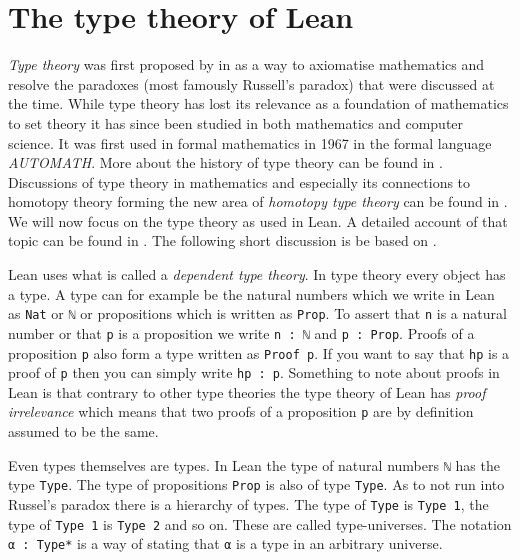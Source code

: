 \section{The type theory of Lean}
\label{sec:typetheory}

\emph{Type theory} was first proposed by  in \citeyear{Russell1908} \cite{Russell1908} as a way to axiomatise mathematics and resolve the paradoxes (most famously Russell's paradox) that were discussed at the time. 
While type theory has lost its relevance as a foundation of mathematics to set theory it has since been studied in both mathematics and computer science. 
It was first used in formal mathematics in 1967 in the formal language \emph{AUTOMATH}. 
More about the history of type theory can be found in \cite{Kamareddine2004}. 
Discussions of type theory in mathematics and especially its connections to homotopy theory forming the new area of \emph{homotopy type theory} can be found in \cite{hottbook}.
We will now focus on the type theory as used in Lean.
A detailed account of that topic can be found in \cite{Carneiro2019}. 
The following short discussion is be based on \cite{Avigad2024}. 

Lean uses what is called a \emph{dependent type theory}.
In type theory every object has a type. 
A type can for example be the natural numbers which we write in Lean as \lstinline{Nat} or \lstinline{ℕ} or propositions which is written as \lstinline{Prop}.
To assert that \lstinline{n} is a natural number or that \lstinline{p} is a proposition we write \lstinline{n : ℕ} and \lstinline{p : Prop}. 
Proofs of a proposition \lstinline{p} also form a type written as \lstinline{Proof p}.
If you want to say that \lstinline{hp} is a proof of \lstinline{p} then you can simply write \lstinline{hp : p}.
Something to note about proofs in Lean is that contrary to other type theories the type theory of Lean has \emph{proof irrelevance} which means that two proofs of a proposition \lstinline{p} are by definition assumed to be the same.

Even types themselves are types. 
In Lean the type of natural numbers \lstinline{ℕ} has the type \lstinline{Type}. 
The type of propositions \lstinline{Prop} is also of type \lstinline{Type}.
As to not run into Russel's paradox there is a hierarchy of types. 
The type of \lstinline{Type} is \lstinline{Type 1}, the type of \lstinline{Type 1} is \lstinline{Type 2} and so on.
These are called type-universes. 
The notation \lstinline{α : Type*} is a way of stating that \lstinline{α} is a type in an arbitrary universe.

